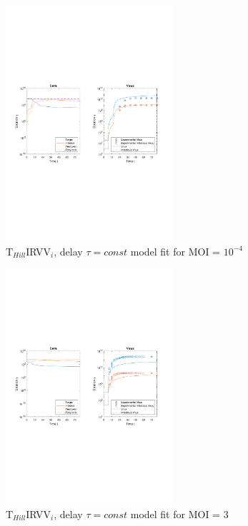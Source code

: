 \newpage

\begin{figure}[H]
\begin{center}
\includegraphics[width=0.55\textwidth, trim={1cm 9.5cm 1cm 9.5cm}, clip]{D_chapters/6_appendix/4_THillIRVViDelayFitTau/ModelTHillIRVViDelayFitTauDSNFittedMOI0.0001B0.000659D0.55529P5629.8721C0.066804TIC2576955.7218TH4.025T0.2iFrac0.025402log.pdf}
\caption[T$_{Hill}$IRVV$_i$, delay $\tau = const$ model fit for MOI = $10^{-4}$]%
{T$_{Hill}$IRVV$_i$, delay $\tau = const$ model fit for MOI = $10^{-4}$}
\label{figure:THillIRVViDelayFitTauMOI00001}
\end{center}
\end{figure}

\begin{figure}[H]
\begin{center}
\includegraphics[width=0.55\textwidth, trim={1cm 9.5cm 1cm 9.5cm}, clip]{D_chapters/6_appendix/4_THillIRVViDelayFitTau/ModelTHillIRVViDelayFitTauDSNFittedMOI3B0.000659D0.55529P5629.8721C0.066804TIC2576955.7218TH4.025T0.2iFrac0.025402log.pdf}
\caption[T$_{Hill}$IRVV$_i$, delay $\tau = const$ model fit for MOI = 3]%
{T$_{Hill}$IRVV$_i$, delay $\tau = const$ model fit for MOI = 3}
\label{figure:THillIRVViDelayFitTauMOI3}
\end{center}
\end{figure}

